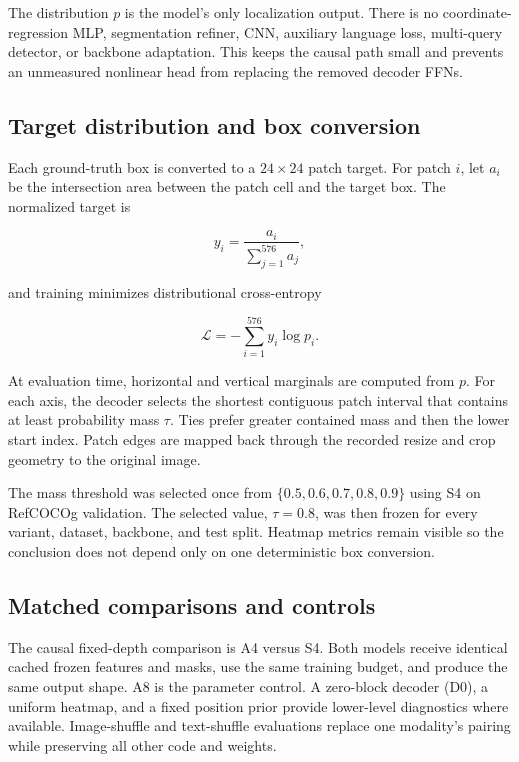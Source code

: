 \documentclass[10pt]{article}
\begin{document}
The distribution $p$ is the model's only localization output. There is no
coordinate-regression MLP, segmentation refiner, CNN, auxiliary language loss,
multi-query detector, or backbone adaptation. This keeps the causal path small
and prevents an unmeasured nonlinear head from replacing the removed decoder
FFNs.

\subsection{Target distribution and box conversion}\label{target-distribution-and-box-conversion}

Each ground-truth box is converted to a $24\times24$ patch target. For patch
$i$, let $a_i$ be the intersection area between the patch cell and the target
box. The normalized target is

\[
y_i=\frac{a_i}{\sum_{j=1}^{576}a_j},
\]

and training minimizes distributional cross-entropy

\[
\mathcal{L}=-\sum_{i=1}^{576}y_i\log p_i.
\]

At evaluation time, horizontal and vertical marginals are computed from $p$.
For each axis, the decoder selects the shortest contiguous patch interval that
contains at least probability mass $\tau$. Ties prefer greater contained mass
and then the lower start index. Patch edges are mapped back through the recorded
resize and crop geometry to the original image.

The mass threshold was selected once from
$\{0.5,0.6,0.7,0.8,0.9\}$ using S4 on RefCOCOg validation. The selected value,
$\tau=0.8$, was then frozen for every variant, dataset, backbone, and test
split. Heatmap metrics remain visible so the conclusion does not depend only on
one deterministic box conversion.

\subsection{Matched comparisons and controls}\label{matched-comparisons-and-controls}

The causal fixed-depth comparison is A4 versus S4. Both models receive
identical cached frozen features and masks, use the same training budget, and
produce the same output shape. A8 is the parameter control. A zero-block
decoder (D0), a uniform heatmap, and a fixed position prior provide lower-level
diagnostics where available. Image-shuffle and text-shuffle evaluations replace
one modality's pairing while preserving all other code and weights.
\end{document}
